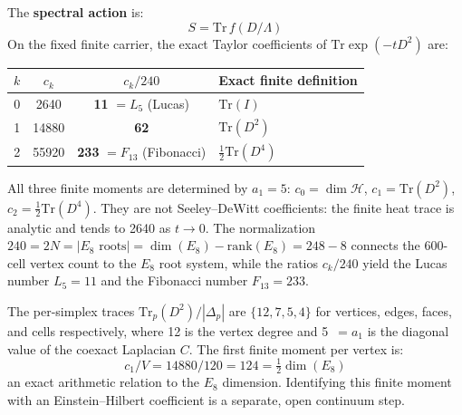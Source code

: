 \documentclass[12pt,a4paper]{article}
\theoremstyle{definition}
\begin{document}
The \textbf{spectral action} \cite{chamseddine1997} is:
\begin{equation}
\boxed{S = \mathrm{Tr}\,f(D/\Lambda)}
\label{eq:spectral_action}
\end{equation}
On the fixed finite carrier, the exact Taylor coefficients of
$\mathrm{Tr}\exp(-tD^2)$ are:
\begin{center}
\begin{tabular}{cccl}
\toprule
$k$ & $c_k$ & $c_k / 240$ & Exact finite definition \\
\midrule
0 & 2640 & \textbf{11} $= L_5$ (Lucas) & $\mathrm{Tr}(I)$ \\
1 & 14880 & \textbf{62} & $\mathrm{Tr}(D^2)$ \\
2 & 55920 & \textbf{233} $= F_{13}$ (Fibonacci) & $\tfrac12\mathrm{Tr}(D^4)$ \\
\bottomrule
\end{tabular}
\end{center}
All three finite moments are determined by $a_1 = 5$: $c_0 = \dim\mathcal{H}$, $c_1 = \mathrm{Tr}(D^2)$, $c_2 = \tfrac{1}{2}\mathrm{Tr}(D^4)$.  They are not Seeley--DeWitt coefficients: the finite heat trace is analytic and tends to 2640 as $t\to0$.  The normalization $240 = 2N = |E_8\text{ roots}| = \dim(E_8) - \mathrm{rank}(E_8) = 248 - 8$ connects the 600-cell vertex count to the $E_8$ root system, while the ratios $c_k/240$ yield the Lucas number $L_5 = 11$ and the Fibonacci number $F_{13} = 233$.

The per-simplex traces $\mathrm{Tr}_p(D^2) / |\Delta_p|$ are $\{12, 7, 5, 4\}$ for vertices, edges, faces, and cells respectively, where 12 is the vertex degree and 5~$= a_1$ is the diagonal value of the coexact Laplacian $C$. The first finite moment per vertex is:
\begin{equation}
c_1 / V = 14880 / 120 = 124 = \tfrac{1}{2}\dim(E_8)
\end{equation}
an exact arithmetic relation to the $E_8$ dimension.  Identifying this finite
moment with an Einstein--Hilbert coefficient is a separate, open continuum
step.
\end{document}

